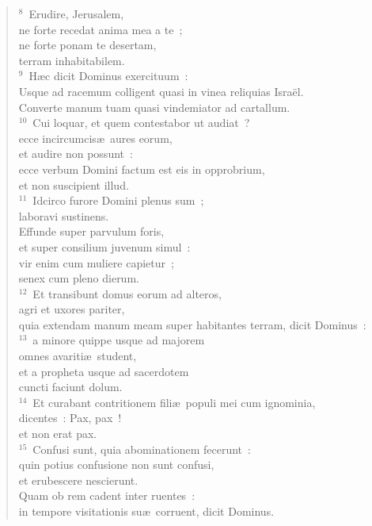 \begin{verse}
${}^{8}$~Erudire, Jerusalem,\\ ne forte recedat anima mea a te~;\\ ne forte ponam te desertam,\\ terram inhabitabilem.\\
${}^{9}$~H\ae c dicit Dominus exercituum~:\\ Usque ad racemum colligent quasi in vinea reliquias Isra\"el.\\ Converte manum tuam quasi vindemiator ad cartallum.\\
${}^{10}$~Cui loquar, et quem contestabor ut audiat~?\\ ecce incircumcis\ae\ aures eorum,\\ et audire non possunt~:\\ ecce verbum Domini factum est eis in opprobrium,\\ et non suscipient illud.\\
${}^{11}$~Idcirco furore Domini plenus sum~;\\ laboravi sustinens.\\ Effunde super parvulum foris,\\ et super consilium juvenum simul~:\\ vir enim cum muliere capietur~;\\ senex cum pleno dierum.\\
${}^{12}$~Et transibunt domus eorum ad alteros,\\ agri et uxores pariter,\\ quia extendam manum meam super habitantes terram, dicit Dominus~:\\
${}^{13}$~a minore quippe usque ad majorem\\ omnes avariti\ae\ student,\\ et a propheta usque ad sacerdotem\\ cuncti faciunt dolum.\\
${}^{14}$~Et curabant contritionem fili\ae\ populi mei cum ignominia,\\ dicentes~: Pax, pax~!\\ et non erat pax.\\
${}^{15}$~Confusi sunt, quia abominationem fecerunt~:\\ quin potius confusione non sunt confusi,\\ et erubescere nescierunt.\\ Quam ob rem cadent inter ruentes~:\\ in tempore visitationis su\ae\ corruent, dicit Dominus.\\

\end{verse}
